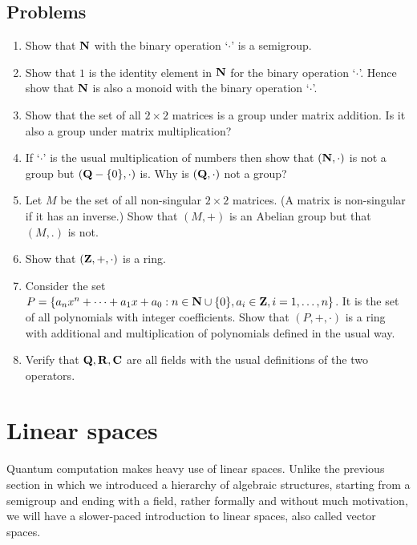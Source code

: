 \subsection{Problems}
\begin{enumerate}
\item Show that $\mathbf{N}$ with the binary operation `$\cdot$' is a semigroup.
\item Show that $1$ is the identity element in $\mathbf{N}$ for the binary operation
`$\cdot$'. Hence show that $\mathbf{N}$ is also a monoid with the binary operation
`$\cdot$'.
\item Show that the set of all $2 \times 2$ matrices is a group under matrix
addition. Is it also a group under matrix multiplication?
\item If `$\cdot$' is the usual multiplication of numbers then show that 
$(\mathbf{N}, \cdot)$ is not a group but $(\mathbf{Q} - \{0\}, \cdot)$ is. Why is $(\mathbf{Q},
\cdot)$ not a group?
\item Let $M$ be the set of all non-singular $2 \times 2$ matrices. (A matrix
is non-singular if it has an inverse.) Show that $(M, +)$ is an Abelian
group but that $(M, .)$ is not.
\item Show that $(\mathbf{Z}, +, \cdot)$ is a ring.
\item Consider the set $P = \{a_nx^n + \cdots + a_1x + a_0 : n \in \mathbf{N} \cup
\{0\}, a_i \in \mathbf{Z}, i = 1, \ldots, n\}$. It is the set of all polynomials with
integer coefficients. Show that $(P, +, \cdot)$ is a ring with additional and
multiplication of polynomials defined in the usual way.
\item Verify that $\mathbf{Q}, \mathbf{R}, \mathbf{C}$ are all fields with the usual definitions
of the two operators.
\end{enumerate}

\section{Linear spaces}\label{c1s6}
Quantum computation makes heavy use of linear spaces. Unlike the previous
section in which we introduced a hierarchy of algebraic structures, starting
from a semigroup and ending with a field, rather formally and without much
motivation, we will have a slower-paced introduction to linear spaces, also
called vector spaces.

